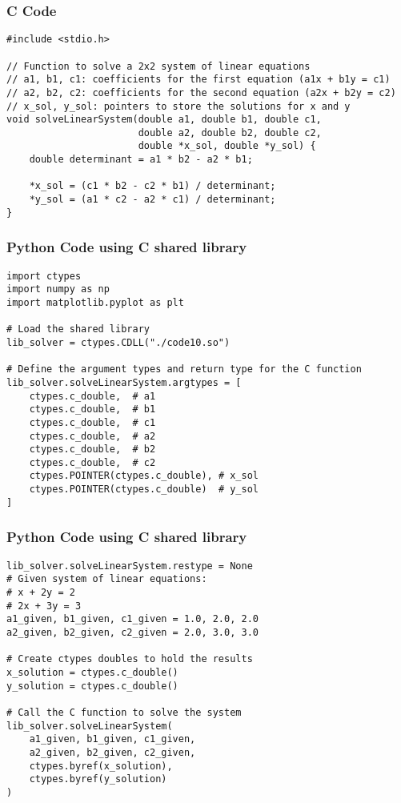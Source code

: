 \documentclass{beamer}
\begin{document}
\begin{frame}[fragile]
\frametitle{C Code}
\begin{lstlisting}
#include <stdio.h>

// Function to solve a 2x2 system of linear equations
// a1, b1, c1: coefficients for the first equation (a1x + b1y = c1)
// a2, b2, c2: coefficients for the second equation (a2x + b2y = c2)
// x_sol, y_sol: pointers to store the solutions for x and y
void solveLinearSystem(double a1, double b1, double c1,
                       double a2, double b2, double c2,
                       double *x_sol, double *y_sol) {
    double determinant = a1 * b2 - a2 * b1;

    *x_sol = (c1 * b2 - c2 * b1) / determinant;
    *y_sol = (a1 * c2 - a2 * c1) / determinant;
}
\end{lstlisting}
\end{frame}

\begin{frame}[fragile]
\frametitle{Python Code using C shared library}
\begin{lstlisting}
import ctypes
import numpy as np
import matplotlib.pyplot as plt

# Load the shared library
lib_solver = ctypes.CDLL("./code10.so")

# Define the argument types and return type for the C function
lib_solver.solveLinearSystem.argtypes = [
    ctypes.c_double,  # a1
    ctypes.c_double,  # b1
    ctypes.c_double,  # c1
    ctypes.c_double,  # a2
    ctypes.c_double,  # b2
    ctypes.c_double,  # c2
    ctypes.POINTER(ctypes.c_double), # x_sol
    ctypes.POINTER(ctypes.c_double)  # y_sol
]
\end{lstlisting}
\end{frame}

\begin{frame}[fragile]
\frametitle{Python Code using C shared library}
\begin{lstlisting}
lib_solver.solveLinearSystem.restype = None
# Given system of linear equations:
# x + 2y = 2
# 2x + 3y = 3
a1_given, b1_given, c1_given = 1.0, 2.0, 2.0
a2_given, b2_given, c2_given = 2.0, 3.0, 3.0

# Create ctypes doubles to hold the results
x_solution = ctypes.c_double()
y_solution = ctypes.c_double()

# Call the C function to solve the system
lib_solver.solveLinearSystem(
    a1_given, b1_given, c1_given,
    a2_given, b2_given, c2_given,
    ctypes.byref(x_solution),
    ctypes.byref(y_solution)
)
\end{lstlisting}
\end{frame}
\end{document}
